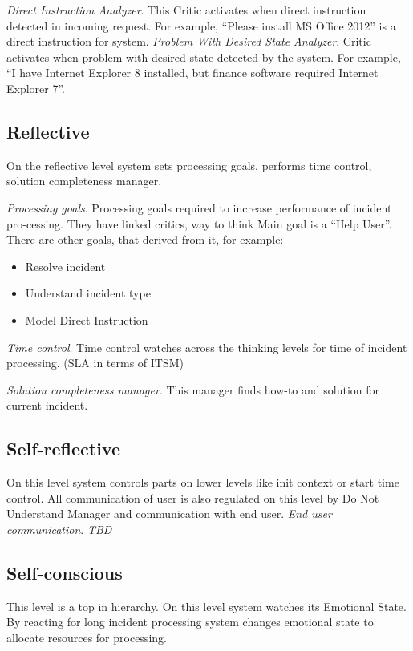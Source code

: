 \documentclass[12pt]{article}
\begin{document}
\emph{Direct Instruction Analyzer}. This Critic activates when direct instruction detected in incoming request. For example, “Please install MS Office 2012” is a direct instruction for system.
\emph{Problem With Desired State Analyzer}. Critic activates when problem with desired state detected by the system. For example, “I have Internet Explorer 8 installed, but finance software required Internet Explorer 7”.

\subsection{Reflective}

On the reflective level system sets processing goals, performs time control, solution completeness manager.

\emph{Processing goals}. Processing goals required to increase performance of incident pro-cessing. They have linked critics, way to think Main goal is a “Help User”. There are other goals, that derived from it, for example:
\begin{itemize}
 \item Resolve incident
 \item Understand incident type
 \item Model Direct Instruction
\end{itemize}

\emph{Time control}. Time control watches across the thinking levels for time of incident processing. (SLA  in terms of ITSM)

\emph{Solution completeness manager}. This manager finds how-to and solution for current incident.

\subsection{Self-reflective}
On this level system controls parts on lower levels like init context or start time control. All communication of user is also regulated on this level by Do Not Understand Manager and communication with end user.
\emph{End user communication}. \emph{TBD}

\subsection{Self-conscious}
This level is a top in hierarchy. On this level system watches its Emotional State. By reacting for long incident processing system changes emotional state to allocate resources for processing.
\end{document}
